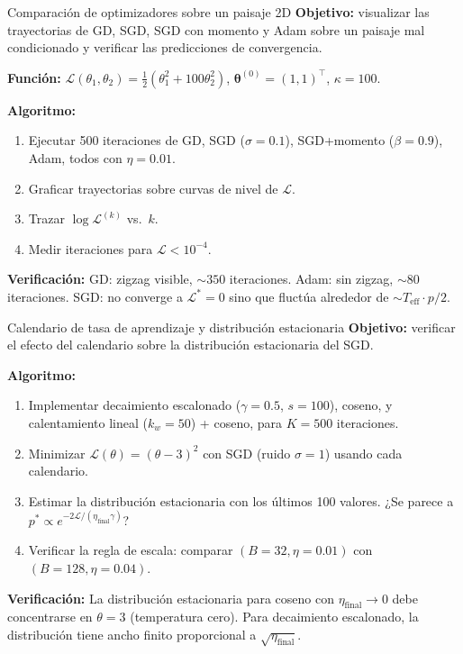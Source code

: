 \begin{ejerciciocomp}{Comparación de optimizadores sobre un paisaje 2D}
\label{ejcomp:optimizadores}
\textbf{Objetivo:} visualizar las trayectorias de GD, SGD, SGD con momento
y Adam sobre un paisaje mal condicionado y verificar las predicciones de
convergencia.

\medskip\noindent\textbf{Función:}
$\mathcal{L}(\theta_1,\theta_2) = \frac{1}{2}(\theta_1^2+100\theta_2^2)$,
$\bm{\theta}^{(0)} = (1,1)^\top$, $\kappa = 100$.

\medskip\noindent\textbf{Algoritmo:}
\begin{enumerate}
  \item Ejecutar 500 iteraciones de GD, SGD ($\sigma = 0.1$), SGD+momento
        ($\beta = 0.9$), Adam, todos con $\eta = 0.01$.
  \item Graficar trayectorias sobre curvas de nivel de $\mathcal{L}$.
  \item Trazar $\log\mathcal{L}^{(k)}$ vs.\ $k$.
  \item Medir iteraciones para $\mathcal{L} < 10^{-4}$.
\end{enumerate}

\medskip\noindent\textbf{Verificación:}
GD: zigzag visible, $\sim 350$ iteraciones.
Adam: sin zigzag, $\sim 80$ iteraciones.
SGD: no converge a $\mathcal{L}^* = 0$ sino que fluctúa alrededor de
$\sim T_{\text{eff}} \cdot p/2$.
\end{ejerciciocomp}

\begin{ejerciciocomp}{Calendario de tasa de aprendizaje y distribución
  estacionaria}
\label{ejcomp:schedule}
\textbf{Objetivo:} verificar el efecto del calendario sobre la
distribución estacionaria del SGD.

\medskip\noindent\textbf{Algoritmo:}
\begin{enumerate}
  \item Implementar decaimiento escalonado ($\gamma = 0.5$, $s = 100$),
        coseno, y calentamiento lineal ($k_w = 50$) + coseno, para
        $K = 500$ iteraciones.
  \item Minimizar $\mathcal{L}(\theta) = (\theta-3)^2$ con SGD
        (ruido $\sigma = 1$) usando cada calendario.
  \item Estimar la distribución estacionaria con los últimos 100 valores.
        ¿Se parece a
        $p^* \propto e^{-2\mathcal{L}/(\eta_{\text{final}}\gamma)}$?
  \item Verificar la regla de escala: comparar
        $(B=32, \eta=0.01)$ con $(B=128, \eta=0.04)$.
\end{enumerate}

\medskip\noindent\textbf{Verificación:}
La distribución estacionaria para coseno con $\eta_{\text{final}} \to 0$
debe concentrarse en $\theta = 3$ (temperatura cero). Para decaimiento
escalonado, la distribución tiene ancho finito proporcional a
$\sqrt{\eta_{\text{final}}}$.
\end{ejerciciocomp}

